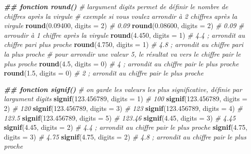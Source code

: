 \documentclass[
]{book}
\newenvironment{Shaded}{\begin{snugshade}}{\end{snugshade}}
\newcommand{\AttributeTok}[1]{\textcolor[rgb]{0.13,0.29,0.53}{#1}}
\newcommand{\CommentTok}[1]{\textcolor[rgb]{0.56,0.35,0.01}{\textit{#1}}}
\newcommand{\DecValTok}[1]{\textcolor[rgb]{0.00,0.00,0.81}{#1}}
\newcommand{\DocumentationTok}[1]{\textcolor[rgb]{0.56,0.35,0.01}{\textbf{\textit{#1}}}}
\newcommand{\FloatTok}[1]{\textcolor[rgb]{0.00,0.00,0.81}{#1}}
\newcommand{\FunctionTok}[1]{\textcolor[rgb]{0.13,0.29,0.53}{\textbf{#1}}}
\newcommand{\NormalTok}[1]{#1}
\begin{document}
\begin{Shaded}
\begin{Highlighting}[]
\DocumentationTok{\#\# fonction round()}
\CommentTok{\# l\textquotesingle{}argument digits permet de définir le nombre de chiffres après la virgule}
\CommentTok{\# exemple si vous voulez arrondir à 2 chiffres après la virgule}
\FunctionTok{round}\NormalTok{(}\FloatTok{0.09400}\NormalTok{, }\AttributeTok{digits =} \DecValTok{2}\NormalTok{) }\CommentTok{\# 0.09}
\FunctionTok{round}\NormalTok{(}\FloatTok{0.08600}\NormalTok{, }\AttributeTok{digits =} \DecValTok{2}\NormalTok{) }\CommentTok{\# 0.09}
\CommentTok{\# arroudir à 1 chiffre après la virgule}
\FunctionTok{round}\NormalTok{(}\FloatTok{4.450}\NormalTok{, }\AttributeTok{digits =} \DecValTok{1}\NormalTok{) }\CommentTok{\# 4.4 ; arrondit au chiffre pari plus proche}
\FunctionTok{round}\NormalTok{(}\FloatTok{4.750}\NormalTok{, }\AttributeTok{digits =} \DecValTok{1}\NormalTok{) }\CommentTok{\# 4.8 ; arrondit au chiffre pari la plus proche}
\CommentTok{\# pour arrondir une valeur 5, le résultat va vers le chiffre pair le plus proche}
\FunctionTok{round}\NormalTok{(}\FloatTok{4.5}\NormalTok{, }\AttributeTok{digits =} \DecValTok{0}\NormalTok{) }\CommentTok{\# 4 ; arrondit au chiffre pair le plus proche}
\FunctionTok{round}\NormalTok{(}\FloatTok{1.5}\NormalTok{, }\AttributeTok{digits =} \DecValTok{0}\NormalTok{) }\CommentTok{\# 2 ; arrondit au chiffre pair le plus proche}

\DocumentationTok{\#\# fonction signif()}
\CommentTok{\# on garde les valeurs les plus significative, définie par l\textquotesingle{}argument digits}
\FunctionTok{signif}\NormalTok{(}\FloatTok{123.456789}\NormalTok{, }\AttributeTok{digits =} \DecValTok{1}\NormalTok{) }\CommentTok{\# 100}
\FunctionTok{signif}\NormalTok{(}\FloatTok{123.456789}\NormalTok{, }\AttributeTok{digits =} \DecValTok{2}\NormalTok{) }\CommentTok{\# 120}
\FunctionTok{signif}\NormalTok{(}\FloatTok{123.456789}\NormalTok{, }\AttributeTok{digits =} \DecValTok{3}\NormalTok{) }\CommentTok{\# 123}
\FunctionTok{signif}\NormalTok{(}\FloatTok{123.456789}\NormalTok{, }\AttributeTok{digits =} \DecValTok{4}\NormalTok{) }\CommentTok{\# 123.5}
\FunctionTok{signif}\NormalTok{(}\FloatTok{123.456789}\NormalTok{, }\AttributeTok{digits =} \DecValTok{5}\NormalTok{) }\CommentTok{\# 123.46 }
\FunctionTok{signif}\NormalTok{(}\FloatTok{4.45}\NormalTok{, }\AttributeTok{digits =} \DecValTok{3}\NormalTok{) }\CommentTok{\# 4.45}
\FunctionTok{signif}\NormalTok{(}\FloatTok{4.45}\NormalTok{, }\AttributeTok{digits =} \DecValTok{2}\NormalTok{) }\CommentTok{\# 4.4 ; arrondit au chiffre pair le plus proche }
\FunctionTok{signif}\NormalTok{(}\FloatTok{4.75}\NormalTok{, }\AttributeTok{digits =} \DecValTok{3}\NormalTok{) }\CommentTok{\# 4.75}
\FunctionTok{signif}\NormalTok{(}\FloatTok{4.75}\NormalTok{, }\AttributeTok{digits =} \DecValTok{2}\NormalTok{) }\CommentTok{\# 4.8 ; arrondit au chiffre pair le plus proche }


\end{Highlighting}
\end{Shaded}
\end{document}

